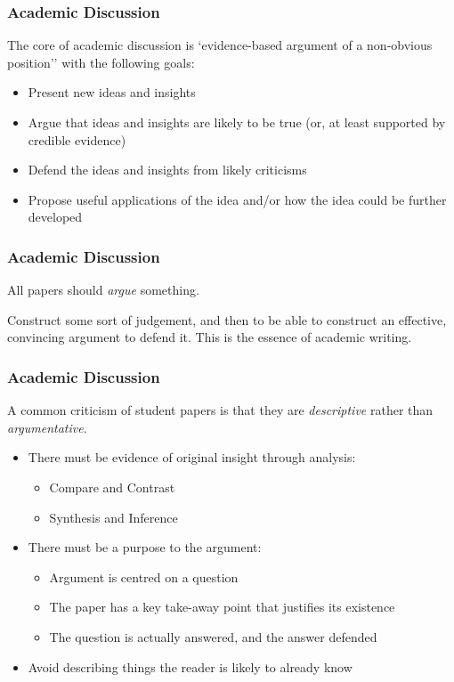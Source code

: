 \begin{frame}
	\frametitle{Academic Discussion}
	
	The core of academic discussion is `evidence-based argument of a non-obvious position'' with the following goals:
		
	\begin{itemize}	
		\item Present new ideas and insights
		\item Argue that ideas and insights are likely to be true (or, at least supported by credible evidence)
		\item Defend the ideas and insights from likely criticisms
		\item Propose useful applications of the idea and/or how the idea could be further developed
	\end{itemize}
\end{frame}

\begin{frame}
	\frametitle{Academic Discussion}
	
	All papers should \textit{argue} something.
	
	\vspace{2em}
	
	Construct some sort of judgement, and then to be able to construct an effective, convincing argument to defend it. This is the essence of academic writing.		
\end{frame}

\begin{frame}
	\frametitle{Academic Discussion}
	
	A common criticism of student papers is that they are \textit{descriptive} rather than \textit{argumentative}.
	
	\begin{itemize}	
		\item There must be evidence of original insight through analysis:
		\begin{itemize}	
			\item Compare and Contrast
			\item Synthesis and Inference
		\end{itemize}	
		\item There must be a purpose to the argument:
		\begin{itemize}	
			\item Argument is centred on a question
			\item The paper has a key take-away point that justifies its existence
			\item The question is actually answered, and the answer defended
		\end{itemize}	
		\item Avoid describing things the reader is likely to already know
	\end{itemize}		
\end{frame}

